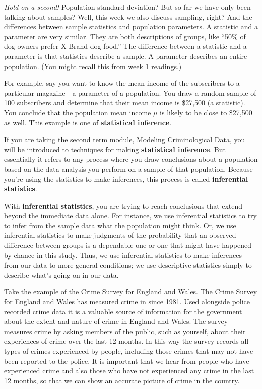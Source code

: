 \documentclass[
]{book}
\begin{document}
\emph{Hold on a second!} Population standard deviation? But so far we have only been talking about samples? Well, this week we also discuss sampling, right? And the differences between sample statistics and population parameters. A statistic and a parameter are very similar. They are both descriptions of groups, like ``50\% of dog owners prefer X Brand dog food.'' The difference between a statistic and a parameter is that statistics describe a sample. A parameter describes an entire population. (You might recall this from week 1 readings.)

For example, say you want to know the mean income of the subscribers to a particular magazine---a parameter of a population. You draw a random sample of 100 subscribers and determine that their mean income is \$27,500 (a statistic). You conclude that the population mean income \(μ\) is likely to be close to \$27,500 as well. This example is one of \textbf{statistical inference}.

If you are taking the second term module, Modeling Criminological Data, you will be introduced to techniques for making \textbf{statistical inference}. But essentially it refers to any process where you draw conclusions about a population based on the data analysis you perform on a sample of that population. Because you're using the statistics to make inferences, this process is called \textbf{inferential statistics}.

With \textbf{inferential statistics}, you are trying to reach conclusions that extend beyond the immediate data alone. For instance, we use inferential statistics to try to infer from the sample data what the population might think. Or, we use inferential statistics to make judgments of the probability that an observed difference between groups is a dependable one or one that might have happened by chance in this study. Thus, we use inferential statistics to make inferences from our data to more general conditions; we use descriptive statistics simply to describe what's going on in our data.

Take the example of the Crime Survey for England and Wales. The Crime Survey for England and Wales has measured crime in since 1981. Used alongside police recorded crime data it is a valuable source of information for the government about the extent and nature of crime in England and Wales. The survey measures crime by asking members of the public, such as yourself, about their experiences of crime over the last 12 months. In this way the survey records all types of crimes experienced by people, including those crimes that may not have been reported to the police. It is important that we hear from people who have experienced crime and also those who have not experienced any crime in the last 12 months, so that we can show an accurate picture of crime in the country.
\end{document}

